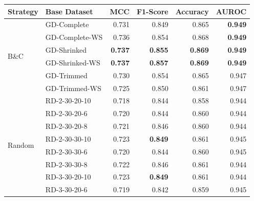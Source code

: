 \begin{table}[ht]
    \centering
    \small
    \begin{tabular}{llrrrr}
        \toprule
        Strategy                 & Base Dataset   & MCC            & F1-Score       & Accuracy       & AUROC          \\
        \midrule
        \multirow{6}{*}{B\&C}    & GD-Complete    & 0.731          & 0.849          & 0.865          & \textbf{0.949} \\
                                 & GD-Complete-WS & 0.736          & 0.854          & 0.868          & \textbf{0.949} \\
                                 & GD-Shrinked    & \textbf{0.737} & \textbf{0.855} & \textbf{0.869} & \textbf{0.949} \\
                                 & GD-Shrinked-WS & \textbf{0.737} & \textbf{0.857} & \textbf{0.869} & \textbf{0.949} \\
                                 & GD-Trimmed     & 0.730          & 0.854          & 0.865          & 0.947          \\
                                 & GD-Trimmed-WS  & 0.725          & 0.850          & 0.861          & 0.947          \\
        \midrule
        \multirow{21}{*}{Random} & RD-2-30-20-10  & 0.718          & 0.844          & 0.858          & 0.944          \\
                                 & RD-2-30-20-6   & 0.720          & 0.844          & 0.860          & 0.944          \\
                                 & RD-2-30-20-8   & 0.721          & 0.846          & 0.860          & 0.944          \\
                                 & RD-2-30-30-10  & 0.723          & \textbf{0.849} & 0.861          & 0.945          \\
                                 & RD-2-30-30-6   & 0.720          & 0.844          & 0.860          & 0.945          \\
                                 & RD-2-30-30-8   & 0.722          & 0.846          & 0.861          & 0.944          \\
                                 & RD-3-30-20-10  & 0.723          & \textbf{0.849} & 0.861          & 0.944          \\
                                 & RD-3-30-20-6   & 0.719          & 0.842          & 0.859          & 0.945          \\

\end{tabular}
\end{table}
